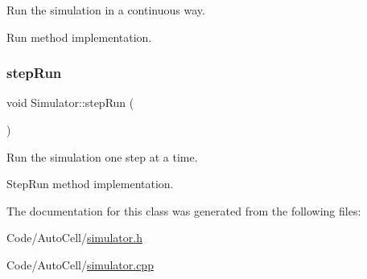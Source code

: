 Run the simulation in a continuous way.

Run method implementation. \mbox{\label{class_simulator_ad84a8ccf003a5c62a47d4e9cbcc11f32}} 
\subsubsection{\texorpdfstring{step\+Run}{stepRun}}
{\footnotesize\ttfamily void Simulator\+::step\+Run (\begin{DoxyParamCaption}{ }\end{DoxyParamCaption})\hspace{0.3cm}{\ttfamily [slot]}}

Run the simulation one step at a time.

Step\+Run method implementation. 

The documentation for this class was generated from the following files\+:\begin{DoxyCompactItemize}
\item 
Code/\+Auto\+Cell/\mbox{\hyperlink{simulator_8h}{simulator.\+h}}\item 
Code/\+Auto\+Cell/\mbox{\hyperlink{simulator_8cpp}{simulator.\+cpp}}\end{DoxyCompactItemize}
